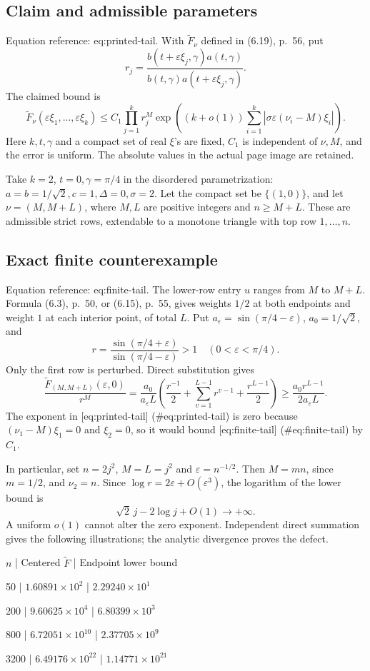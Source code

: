 \documentclass[10pt]{article}
\begin{document}
\subsection*{Claim and admissible parameters}
Equation reference: eq:printed-tail. With \(\widetilde F_\nu\) defined in (6.19), p. 56, put \[r_j=\frac{b(t+\varepsilon\xi_j,\gamma)a(t,\gamma)}
 {b(t,\gamma)a(t+\varepsilon\xi_j,\gamma)}.\] The claimed bound is \[
 \widetilde F_\nu(\varepsilon\xi_1,\ldots,\varepsilon\xi_k)
 \le C_1\prod_{j=1}^k r_j^M
 \exp\left((k+o(1))\sum_{i=1}^k
       |\sigma\varepsilon(\nu_i-M)\xi_i|\right).\] Here \(k,t,\gamma\) and a compact set of real \(\xi\)’s are fixed, \(C_1\) is independent of \(\nu,M\), and the error is uniform. The absolute values in the actual page image are retained.\par
Take \(k=2\), \(t=0,\gamma=\pi/4\) in the disordered parametrization: \(a=b=1/\sqrt2,c=1,\Delta=0,\sigma=2\). Let the compact set be \(\{(1,0)\}\), and let \(\nu=(M,M+L)\), where \(M,L\) are positive integers and \(n\ge M+L\). These are admissible strict rows, extendable to a monotone triangle with top row \(1,\ldots,n\).\par
\subsection*{Exact finite counterexample}
Equation reference: eq:finite-tail. The lower-row entry \(u\) ranges from \(M\) to \(M+L\). Formula (6.3), p. 50, or (6.15), p. 55, gives weights \(1/2\) at both endpoints and weight \(1\) at each interior point, of total \(L\). Put \(a_\varepsilon=\sin(\pi/4-\varepsilon)\), \(a_0=1/\sqrt2\), and \[r=\frac{\sin(\pi/4+\varepsilon)}{\sin(\pi/4-\varepsilon)}>1
 \quad(0<\varepsilon<\pi/4).\] Only the first row is perturbed. Direct substitution gives \[
 \frac{\widetilde F_{(M,M+L)}(\varepsilon,0)}{r^M}
 =\frac{a_0}{a_\varepsilon L}
 \left(\frac{r^{-1}}2+\sum_{v=1}^{L-1}r^{v-1}
                   +\frac{r^{L-1}}2\right)
 \ge\frac{a_0r^{L-1}}{2a_\varepsilon L}.\] The exponent in [eq:printed-tail] (\#eq:printed-tail) is zero because \((\nu_1-M)\xi_1=0\) and \(\xi_2=0\), so it would bound [eq:finite-tail] (\#eq:finite-tail) by \(C_1\).\par
In particular, set \(n=2j^2\), \(M=L=j^2\) and \(\varepsilon=n^{-1/2}\). Then \(M=mn\), since \(m=1/2\), and \(\nu_2=n\). Since \(\log r=2\varepsilon+O(\varepsilon^3)\), the logarithm of the lower bound is \[\sqrt2\,j-2\log j+O(1)\longrightarrow+\infty .\] A uniform \(o(1)\) cannot alter the zero exponent. Independent direct summation gives the following illustrations; the analytic divergence proves the defect.\par
\(n\) | Centered \(\widetilde F\) | Endpoint lower bound\par
50 | \(1.60891\times10^2\) | \(2.29240\times10^1\)\par
200 | \(9.60625\times10^4\) | \(6.80399\times10^3\)\par
800 | \(6.72051\times10^{10}\) | \(2.37705\times10^9\)\par
3200 | \(6.49176\times10^{22}\) | \(1.14771\times10^{21}\)\par
\end{document}
